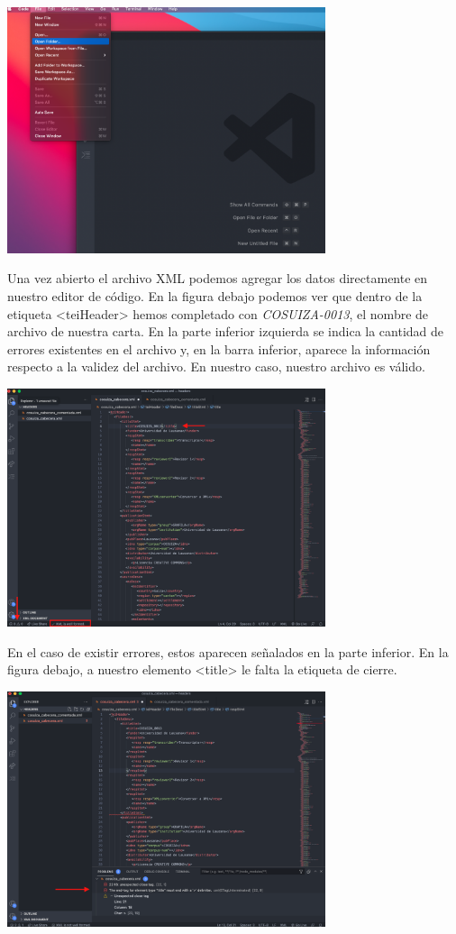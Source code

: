 \documentclass[
]{book}
\begin{document}
\includegraphics[width=0.7\textwidth,height=\textheight]{img/vsc3.png}

Una vez abierto el archivo XML podemos agregar los datos directamente en nuestro editor de código. En la figura debajo podemos ver que dentro de la etiqueta { \textless teiHeader\textgreater{}} hemos completado con \emph{COSUIZA-0013}, el nombre de archivo de nuestra carta. En la parte inferior izquierda se indica la cantidad de errores existentes en el archivo y, en la barra inferior, aparece la información respecto a la validez del archivo. En nuestro caso, nuestro archivo es válido.

\includegraphics[width=0.7\textwidth,height=\textheight]{img/vsc4.png}

En el caso de existir errores, estos aparecen señalados en la parte inferior. En la figura debajo, a nuestro elemento {\textless title\textgreater{}} le falta la etiqueta de cierre.

\includegraphics[width=0.7\textwidth,height=\textheight]{img/vsc5.png}
\end{document}
